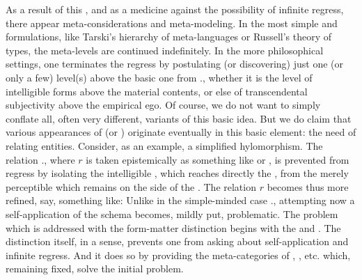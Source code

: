 \pa\label{pa:equfm}
As a result of this , and as a medicine against the possibility
of infinite regress, there appear {meta}-considerations and
{meta}-modeling. In the most simple and  formulations, 
like Tarski's hierarchy of meta-languages or Russell's theory of types, the
{meta}-levels are continued indefinitely. In the more philosophical
settings, one terminates the regress by postulating (or discovering) just one
(or only a few) level(s) above the basic one from
., whether it is 
the level of intelligible forms above the material contents, or else of
transcendental subjectivity above the empirical ego. Of course, we do not want
to simply conflate all, often very different, variants of this basic idea. But
we do claim that various appearances of  (or ) originate
eventually in this 
basic element: the need of relating  entities. Consider, as an
example, a simplified hylomorphism. The relation ., where $r$ is
taken epistemically as something like  or , is
prevented from regress by isolating the intelligible , which reaches
directly the , from the merely perceptible  which
remains on the side of the . The relation $r$ becomes thus more
refined, say, something like:
Unlike in the simple-minded case ., attempting
now a self-application of the schema becomes, mildly put, problematic. The
problem which is addressed with the form-matter distinction begins with the
 and . The distinction itself, in a sense,
prevents one from asking about self-application and infinite regress. And it
does so by providing the {meta}-categories of , , etc.
which, remaining fixed, solve the initial problem.

